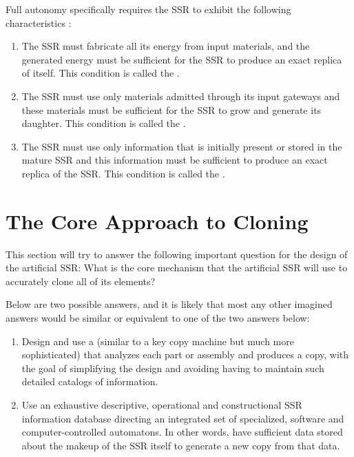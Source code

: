 Full autonomy specifically requires the SSR to exhibit the following characteristics \citep{freitasmerkle2004}:

\begin{enumerate}
\item The SSR must fabricate all its energy from input materials, and the
generated energy must be sufficient for the SSR to produce an exact
replica of itself. This condition is called the . 
\item The SSR must use only materials admitted through its input gateways
and these materials must be sufficient for the SSR to grow and generate
its daughter. This condition is called the . 
\item The SSR must use only information that is initially present or stored in the
mature SSR and this information must be sufficient to produce an
exact replica of the SSR. This condition is called the
.
\end{enumerate}

\section{The Core Approach to Cloning}

This section will try to answer the following important question for
the design of the artificial SSR: What is the core mechanism that
the artificial SSR will use to accurately clone all of its elements?

Below are two possible answers, and it is likely that most any other
imagined answers would be similar or equivalent to one of the
two answers below:

\begin{enumerate}
\item Design and use a  (similar to a key copy
machine but much more sophisticated) that analyzes each part or assembly and produces
a copy, with the goal of simplifying the design and
avoiding having to maintain such detailed catalogs of information.
\item Use an exhaustive descriptive, operational and constructional SSR
information database directing an integrated set of specialized, software
and computer-controlled automatons.  In other words, have sufficient
data stored about the makeup of the SSR itself to generate a new copy
from that data.
\end{enumerate}

